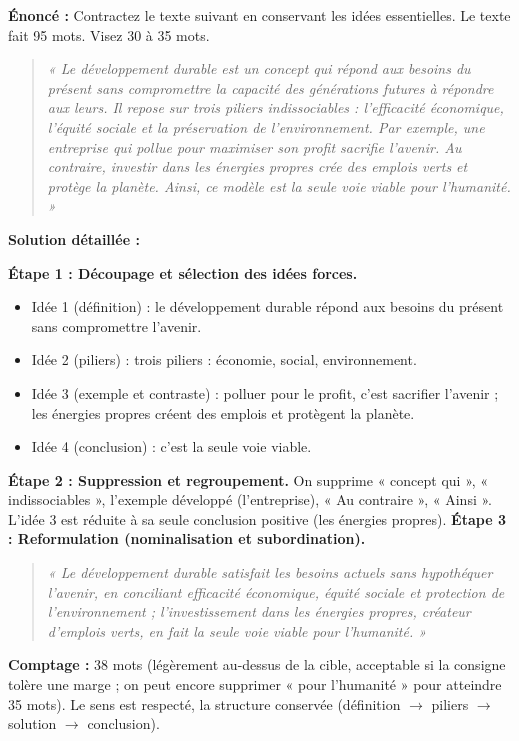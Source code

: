 \documentclass[11pt]{article}
\begin{document}
\begin{exoresolu}
\textbf{Énoncé :} Contractez le texte suivant en conservant les idées essentielles. Le texte fait 95 mots. Visez 30 à 35 mots.
\begin{quote}
\emph{« Le développement durable est un concept qui répond aux besoins du présent sans compromettre la capacité des générations futures à répondre aux leurs. Il repose sur trois piliers indissociables : l'efficacité économique, l'équité sociale et la préservation de l'environnement. Par exemple, une entreprise qui pollue pour maximiser son profit sacrifie l'avenir. Au contraire, investir dans les énergies propres crée des emplois verts et protège la planète. Ainsi, ce modèle est la seule voie viable pour l'humanité. »}
\end{quote}
\tcblower
\textbf{Solution détaillée :}

\textbf{Étape 1 : Découpage et sélection des idées forces.}
\begin{itemize}
    \item Idée 1 (définition) : le développement durable répond aux besoins du présent sans compromettre l'avenir.
    \item Idée 2 (piliers) : trois piliers : économie, social, environnement.
    \item Idée 3 (exemple et contraste) : polluer pour le profit, c'est sacrifier l'avenir ; les énergies propres créent des emplois et protègent la planète.
    \item Idée 4 (conclusion) : c'est la seule voie viable.
\end{itemize}
\textbf{Étape 2 : Suppression et regroupement.}
On supprime « concept qui », « indissociables », l'exemple développé (l'entreprise), « Au contraire », « Ainsi ». L'idée 3 est réduite à sa seule conclusion positive (les énergies propres).
\textbf{Étape 3 : Reformulation (nominalisation et subordination).}
\begin{quote}
\emph{« Le développement durable satisfait les besoins actuels sans hypothéquer l'avenir, en conciliant efficacité économique, équité sociale et protection de l'environnement ; l'investissement dans les énergies propres, créateur d'emplois verts, en fait la seule voie viable pour l'humanité. »}
\end{quote}
\textbf{Comptage :} 38 mots (légèrement au-dessus de la cible, acceptable si la consigne tolère une marge ; on peut encore supprimer « pour l'humanité » pour atteindre 35 mots). Le sens est respecté, la structure conservée (définition $\to$ piliers $\to$ solution $\to$ conclusion).
\end{exoresolu}
\end{document}
